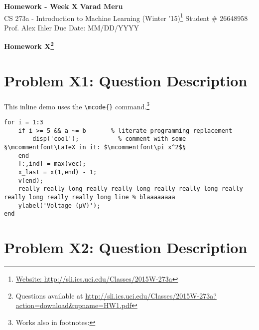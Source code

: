 \documentclass[a4paper, 11pt]{article}
\begin{document}
\begin{noindent}
\large\textbf{Homework - Week X} \hfill \textbf{Varad Meru} \\
\normalsize CS 273a - Introduction to Machine Learning (Winter '15)\footnote{\href{http://sli.ics.uci.edu/Classes/2015W-273a}{Website: http://sli.ics.uci.edu/Classes/2015W-273a}} \hfill Student \# 26648958 \\
Prof. Alex Ihler \hfill Due Date: MM/DD/YYYY
\end{noindent}
\noindent\makebox[\linewidth]{\rule{\textwidth}{0.4pt}}

\begin{center}
\textbf{\Large{Homework X}\footnote{Questions available at \href{http://sli.ics.uci.edu/Classes/2015W-273a?action=download&upname=HW1.pdf}{http://sli.ics.uci.edu/Classes/2015W-273a?action=download\&upname=HW1.pdf}}}\\
\end{center}
\vspace{-25pt}
\section*{Problem X1: Question Description}
\vspace{-5pt}
\lipsum[1]

This inline demo  uses the \verb|\mcode{}| command.\footnote{Works also in footnotes: }
\begin{lstlisting}
for i = 1:3
	if i >= 5 && a ~= b       % literate programming replacement
		disp('cool');           % comment with some §\mcommentfont\LaTeX in it: $\mcommentfont\pi x^2$§
	end
	[:,ind] = max(vec);
	x_last = x(1,end) - 1;
	v(end);
	really really long really really long really really long really really long really really long line % blaaaaaaaa
	ylabel('Voltage (µV)');
end
\end{lstlisting}
\lipsum[2]


\vspace{-10pt}
\section*{Problem X2: Question Description}
\vspace{-5pt}
\lipsum[6]
\end{document}
